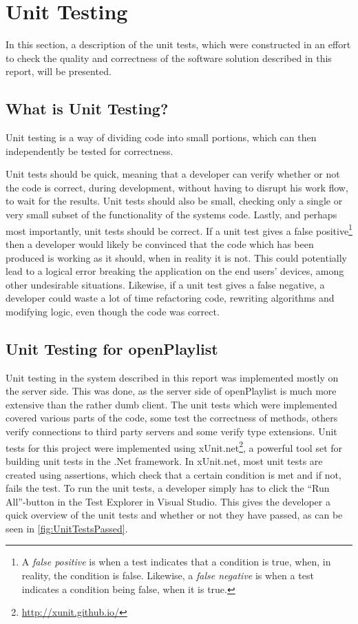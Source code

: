 \section{Unit Testing}
\label{unitTesting}
In this section, a description of the unit tests, which were constructed in an effort to check the quality and correctness of the software solution described in this report, will be presented.

\subsection{What is Unit Testing?}
Unit testing is a way of dividing code into small portions, which can then independently be tested for correctness\cite{unittesting}.

Unit tests should be quick, meaning that a developer can verify whether or not the code is correct, during development, without having to disrupt his work flow, to wait for the results.
Unit tests should also be small, checking only a single or very small subset of the functionality of the systems code.
Lastly, and perhaps most importantly, unit tests should be correct. If a unit test gives a false positive\footnote{A \emph{false positive} is when a test indicates that a condition is true, when, in reality, the condition is false. Likewise, a \emph{false negative} is when a test indicates a condition being false, when it is true.} then a developer would likely be convinced that the code which has been produced is working as it should, when in reality it is not. This could potentially lead to a logical error breaking the application on the end users' devices, among other undesirable situations. Likewise, if a unit test gives a false negative, a developer could waste a lot of time refactoring code, rewriting algorithms and modifying logic, even though the code was correct.

\subsection{Unit Testing for openPlaylist}
Unit testing in the system described in this report was implemented mostly on the server side. This was done, as the server side of openPlaylist is much more extensive than the rather dumb client.
The unit tests which were implemented covered various parts of the code, some test the correctness of methods, others verify connections to third party servers and some verify type extensions.
Unit tests for this project were implemented using xUnit.net\footnote{\url{http://xunit.github.io/}}, a powerful tool set for building unit tests in the .Net framework. In xUnit.net, most unit tests are created using assertions, which check that a certain condition is met and if not, fails the test.
To run the unit tests, a developer simply has to click the \enquote{Run All}-button in the Test Explorer in Visual Studio. This gives the developer a quick overview of the unit tests and whether or not they have passed, as can be seen in \cref{fig:UnitTestsPassed}.

